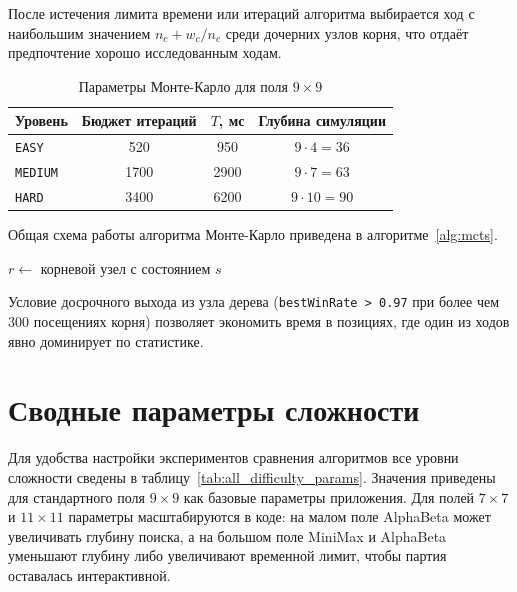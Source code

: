 \documentclass[a4paper,12pt]{diplom}
\begin{document}
После истечения лимита времени или итераций алгоритма выбирается ход с наибольшим значением $n_c + w_c / n_c$ среди дочерних узлов корня, что отдаёт предпочтение хорошо исследованным ходам.

\begin{table}[H]
    \centering
    \caption{Параметры Монте-Карло для поля $9\times9$}
    \label{tab:mcts_params}
    \begin{tabular}{lccc}
        \toprule
        Уровень & Бюджет итераций & $T$, мс & Глубина симуляции \\
        \midrule
        \texttt{EASY}   & 520  & 950  & $9 \cdot 4 = 36$ \\
        \texttt{MEDIUM} & 1700 & 2900 & $9 \cdot 7 = 63$ \\
        \texttt{HARD}   & 3400 & 6200 & $9 \cdot 10 = 90$ \\
        \bottomrule
    \end{tabular}
\end{table}

Общая схема работы алгоритма Монте-Карло приведена в алгоритме~\ref{alg:mcts}.

\begin{algorithm}[H]
\caption{Монте-Карло}\label{alg:mcts}
$r \leftarrow$ корневой узел с состоянием $s$\;
\end{algorithm}

Условие досрочного выхода из узла дерева (\texttt{bestWinRate > 0.97} при более чем 300 посещениях корня) позволяет экономить время в позициях, где один из ходов явно доминирует по статистике.

\section{Сводные параметры сложности}

Для удобства настройки экспериментов сравнения алгоритмов все уровни сложности сведены в таблицу~\ref{tab:all_difficulty_params}. Значения приведены для стандартного поля $9\times9$ как базовые параметры приложения. Для полей $7\times7$ и $11\times11$ параметры масштабируются в коде: на малом поле AlphaBeta может увеличивать глубину поиска, а на большом поле MiniMax и AlphaBeta уменьшают глубину либо увеличивают временной лимит, чтобы партия оставалась интерактивной.
\end{document}
